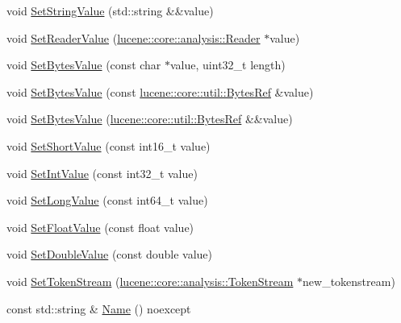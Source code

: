 \begin{DoxyCompactItemize}
\item 
void \mbox{\hyperlink{classlucene_1_1core_1_1document_1_1Field_aab2351ba0550add74c590be2c2bf9208}{Set\+String\+Value}} (std\+::string \&\&value)
\item 
void \mbox{\hyperlink{classlucene_1_1core_1_1document_1_1Field_a390d9638f5aa3de19d94b9259afee2b2}{Set\+Reader\+Value}} (\mbox{\hyperlink{classlucene_1_1core_1_1analysis_1_1Reader}{lucene\+::core\+::analysis\+::\+Reader}} $\ast$value)
\item 
void \mbox{\hyperlink{classlucene_1_1core_1_1document_1_1Field_a4b92c42bb91ef113806dbee6d4ee12d1}{Set\+Bytes\+Value}} (const char $\ast$value, uint32\+\_\+t length)
\item 
void \mbox{\hyperlink{classlucene_1_1core_1_1document_1_1Field_a96f2902e74079e79fe469487b1113b13}{Set\+Bytes\+Value}} (const \mbox{\hyperlink{classlucene_1_1core_1_1util_1_1BytesRef}{lucene\+::core\+::util\+::\+Bytes\+Ref}} \&value)
\item 
void \mbox{\hyperlink{classlucene_1_1core_1_1document_1_1Field_a7a43e20d30825a755b748f7888761b0a}{Set\+Bytes\+Value}} (\mbox{\hyperlink{classlucene_1_1core_1_1util_1_1BytesRef}{lucene\+::core\+::util\+::\+Bytes\+Ref}} \&\&value)
\item 
void \mbox{\hyperlink{classlucene_1_1core_1_1document_1_1Field_a63dc549c5dcff4cfe1a1f03a1935136b}{Set\+Short\+Value}} (const int16\+\_\+t value)
\item 
void \mbox{\hyperlink{classlucene_1_1core_1_1document_1_1Field_a9a316ba10e33e335641ca493e56b14ea}{Set\+Int\+Value}} (const int32\+\_\+t value)
\item 
void \mbox{\hyperlink{classlucene_1_1core_1_1document_1_1Field_aab04835cd19c035020d5baef05896d68}{Set\+Long\+Value}} (const int64\+\_\+t value)
\item 
void \mbox{\hyperlink{classlucene_1_1core_1_1document_1_1Field_a40a87a62fd8f67ea79a0e44bc64d88c6}{Set\+Float\+Value}} (const float value)
\item 
void \mbox{\hyperlink{classlucene_1_1core_1_1document_1_1Field_ab433593d18b62f1ce0be976b50fdc62e}{Set\+Double\+Value}} (const double value)
\item 
void \mbox{\hyperlink{classlucene_1_1core_1_1document_1_1Field_a33db504416c882960fa2207de75d3510}{Set\+Token\+Stream}} (\mbox{\hyperlink{classlucene_1_1core_1_1analysis_1_1TokenStream}{lucene\+::core\+::analysis\+::\+Token\+Stream}} $\ast$new\+\_\+tokenstream)
\item 
const std\+::string \& \mbox{\hyperlink{classlucene_1_1core_1_1document_1_1Field_aec97d60c8348878b7fbaed0be2e3c023}{Name}} () noexcept

\end{DoxyCompactItemize}
